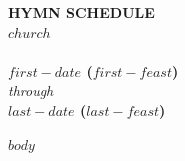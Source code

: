 \documentclass[12pt]{article}
\newcommand{\cross}{\textcolor{schedred}{\CrossMaltese}}
\begin{document}
{%
\centering
\textbf{\Large HYMN SCHEDULE} \\[0.2em]
\textbf{\large $church$} \\[0.6em]
{\Large \cross} \\[0.5em]
\textcolor{schedred}{\textbf{$first-date$ ($first-feast$)}} \\[0.3em]
\textcolor{schedred}{\textit{through}} \\[0.3em]
\textcolor{schedred}{\textbf{$last-date$ ($last-feast$)}} \\[0.5em]
\par
}

\vspace{0.5em}

$body$
\end{document}
